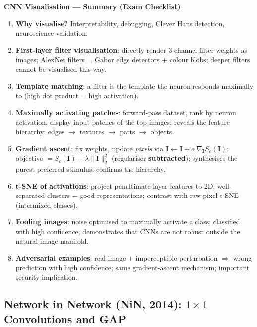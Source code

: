 \documentclass[11pt,a4paper]{article}
\begin{document}
\begin{tcolorbox}[colback=WarningRedBg,colframe=WarningRed,boxrule=0.8pt,arc=3pt]
\textbf{CNN Visualisation — Summary (Exam Checklist)}
\begin{enumerate}
  \item \textbf{Why visualise?} Interpretability, debugging, Clever Hans detection, neuroscience validation.
  \item \textbf{First-layer filter visualisation}: directly render $3$-channel filter weights as images; AlexNet filters = Gabor edge detectors + colour blobs; deeper filters cannot be visualised this way.
  \item \textbf{Template matching}: a filter is the template the neuron responds maximally to (high dot product = high activation).
  \item \textbf{Maximally activating patches}: forward-pass dataset, rank by neuron activation, display input patches of the top images; reveals the feature hierarchy: edges $\to$ textures $\to$ parts $\to$ objects.
  \item \textbf{Gradient ascent}: fix weights, update \emph{pixels} via $\mathbf{I} \leftarrow \mathbf{I} + \alpha\,\nabla_\mathbf{I} S_c(\mathbf{I})$; objective $= S_c(\mathbf{I}) - \lambda\|\mathbf{I}\|_2^2$ (regulariser \textbf{subtracted}); synthesises the purest preferred stimulus; confirms the hierarchy.
  \item \textbf{t-SNE of activations}: project penultimate-layer features to 2D; well-separated clusters = good representations; contrast with raw-pixel t-SNE (intermixed classes).
  \item \textbf{Fooling images}: noise optimised to maximally activate a class; classified with high confidence; demonstrates that CNNs are not robust outside the natural image manifold.
  \item \textbf{Adversarial examples}: real image + imperceptible perturbation $\Rightarrow$ wrong prediction with high confidence; same gradient-ascent mechanism; important security implication.
\end{enumerate}
\end{tcolorbox}

\subsection{Network in Network (NiN, 2014): $1\times1$ Convolutions and GAP}
\label{sec:nin}
\end{document}
